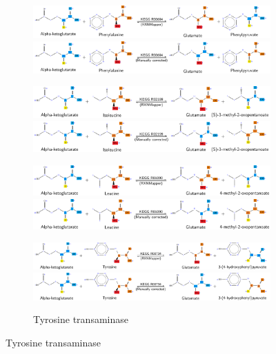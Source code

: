 \documentclass[varwidth=true]{standalone}
\begin{document}
\begin{figure}
     \begin{subfigure}[t]{1.0\textwidth}
        \caption{Phenylalanine transaminase}
        \includegraphics[width=1.0\textwidth]{phenylalanine-transaminase-incorrect.pdf}
        \includegraphics[width=1.0\textwidth]{phenylalanine-transaminase-correct.pdf}
        \caption{Isoleucine transaminase}
        \includegraphics[width=1.0\textwidth]{isoleucine-transaminase-incorrect.pdf}
        \includegraphics[width=1.0\textwidth]{isoleucine-transaminase-correct.pdf}
        \caption{Leucine transaminase}
        \includegraphics[width=1.0\textwidth]{leucine-transaminase-incorrect.pdf}
        \includegraphics[width=1.0\textwidth]{leucine-transaminase-correct.pdf}
        \caption{Tyrosine transaminase}
        \includegraphics[width=1.0\textwidth]{tyrosine-transaminase-incorrect.pdf}
        \includegraphics[width=1.0\textwidth]{tyrosine-transaminase-correct.pdf}

\end{subfigure}
\end{figure}
\end{document}
